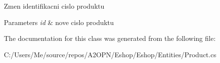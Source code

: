 Zmen identifikacni cislo produktu 


\begin{DoxyParams}{Parameters}
{\em id} & nove cislo produktu\\
\hline
\end{DoxyParams}


The documentation for this class was generated from the following file\+:\begin{DoxyCompactItemize}
\item 
C\+:/\+Users/\+Me/source/repos/\+A2\+O\+P\+N/\+Eshop/\+Eshop/\+Entities/Product.\+cs\end{DoxyCompactItemize}
